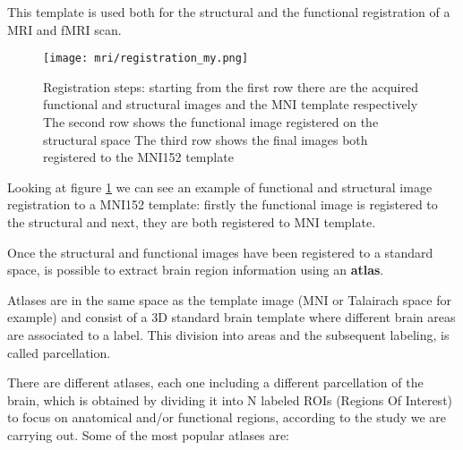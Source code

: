 \documentclass[11pt]{report}
\begin{document}
\hfill

\noindent This template is used both for the structural and the functional registration of a MRI and fMRI scan.

\begin{figure}
\centering
\texttt{[image: mri/registration\_my.png]}
\caption{Registration steps:
 starting from the first row there are the acquired functional and structural images and the MNI template respectively
 The second row shows the functional image registered on the structural space
 The third row shows the final images both registered to the MNI152 template
}
\label{fig:registrationchart}
\end{figure}

Looking at figure \ref{fig:registrationchart} we can see an example of functional and structural image registration to a MNI152 template: firstly the functional image is registered to the structural and next, they are both registered to MNI template.

Once the structural and functional images have been registered to a standard space, is possible to extract brain region information using an \textbf{atlas}.

Atlases are in the same space as the template image (MNI or Talairach space for example) and consist of a 3D standard brain template where different brain areas are associated to a label.
This division into areas and the subsequent labeling, is called parcellation.

There are different atlases, each one including a different parcellation of the brain, which is obtained by dividing it into N labeled ROIs
(Regions Of Interest) to focus on anatomical and/or functional regions, according to the study we are carrying out.
Some of the most popular atlases are:
\end{document}
